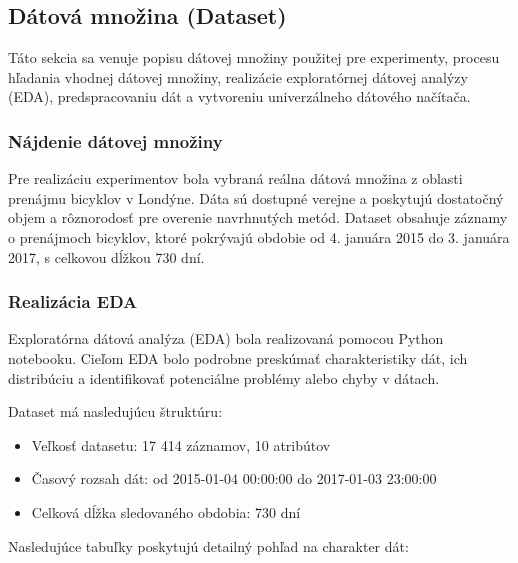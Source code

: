\subsection{Dátová množina (Dataset) \cite{Dataset}}

Táto sekcia sa venuje popisu dátovej množiny použitej pre experimenty, procesu hľadania vhodnej dátovej množiny, realizácie exploratórnej dátovej analýzy (EDA), predspracovaniu dát a vytvoreniu univerzálneho dátového načítača.

\subsubsection{Nájdenie dátovej množiny}
Pre realizáciu experimentov bola vybraná reálna dátová množina z oblasti prenájmu bicyklov v Londýne. Dáta sú dostupné verejne a poskytujú dostatočný objem a rôznorodosť pre overenie navrhnutých metód. Dataset obsahuje záznamy o prenájmoch bicyklov, ktoré pokrývajú obdobie od 4. januára 2015 do 3. januára 2017, s celkovou dĺžkou 730 dní.

\subsubsection{Realizácia EDA}
Exploratórna dátová analýza (EDA) bola realizovaná pomocou Python notebooku. Cieľom EDA bolo podrobne preskúmať charakteristiky dát, ich distribúciu a identifikovať potenciálne problémy alebo chyby v dátach.

Dataset má nasledujúcu štruktúru:
\begin{itemize}
\item Veľkosť datasetu: 17 414 záznamov, 10 atribútov
\item Časový rozsah dát: od 2015-01-04 00:00:00 do 2017-01-03 23:00:00
\item Celková dĺžka sledovaného obdobia: 730 dní
\end{itemize}

\newpage
Nasledujúce tabuľky poskytujú detailný pohľad na charakter dát:


